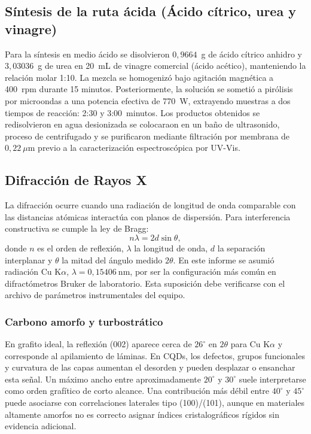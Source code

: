 \subsection{Síntesis de la ruta ácida (Ácido cítrico, urea y vinagre)}
Para la síntesis en medio ácido se disolvieron $0{,}9664$~g de ácido cítrico anhidro y $3{,}03036$~g de urea en 20~mL de vinagre comercial (ácido acético), manteniendo la relación molar 1:10. La mezcla se homogenizó bajo agitación magnética a 400~rpm durante 15 minutos.
Posteriormente, la solución se sometió a pirólisis por microondas a una potencia efectiva de 770~W, extrayendo muestras a dos tiempos de reacción: 2:30 y 3:00~minutos. Los productos obtenidos se redisolvieron en agua desionizada se colocaraon en un baño de ultrasonido, proceso de centrifugado y se purificaron mediante filtración por membrana de $0{,}22~\mu$m previo a la caracterización espectroscópica por UV-Vis.

\subsection{Difracción de Rayos X}
La difracción ocurre cuando una radiación de longitud de onda comparable con las distancias atómicas interactúa con planos de dispersión. Para interferencia constructiva se cumple la ley de Bragg:
\begin{equation}
	n\lambda = 2d\sin\theta ,
	\label{eq:bragg}
\end{equation}
donde \(n\) es el orden de reflexión, \(\lambda\) la longitud de onda, \(d\) la separación interplanar y \(\theta\) la mitad del ángulo medido \(2\theta\). En este informe se asumió radiación Cu K\(\alpha\), \(\lambda=0{,}15406\ \mathrm{nm}\), por ser la configuración más común en difractómetros Bruker de laboratorio. Esta suposición debe verificarse con el archivo de parámetros instrumentales del equipo.
\subsubsection{Carbono amorfo y turbostrático}
En grafito ideal, la reflexión (002) aparece cerca de \(26^\circ\) en \(2\theta\) para Cu K\(\alpha\) y corresponde al apilamiento de láminas. En CQDs, los defectos, grupos funcionales y curvatura de las capas aumentan el desorden y pueden desplazar o ensanchar esta señal. Un máximo ancho entre aproximadamente \(20^\circ\) y \(30^\circ\) suele interpretarse como orden grafítico de corto alcance. Una contribución más débil entre \(40^\circ\) y \(45^\circ\) puede asociarse con correlaciones laterales tipo (100)/(101), aunque en materiales altamente amorfos no es correcto asignar índices cristalográficos rígidos sin evidencia adicional.
